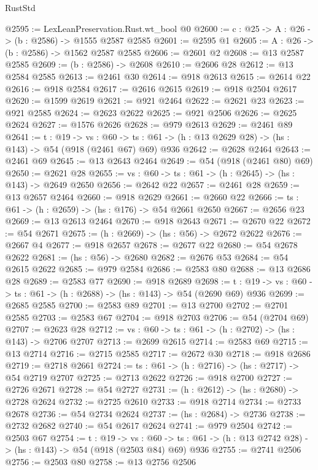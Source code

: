 \begin{lexlean}{RustStd}
\begin{coremodule}
@2595 := LexLeanPreservation.Rust.wt_bool @0
@2600 := {c : @25} -> {A : @26} -> (b : @2586) -> @1555 @2587 @2585
@2601 := @2595 @1
@2605 := {A : @26} -> (b : @2586) -> @1562 @2587 @2585
@2606 := @2601 @2
@2608 := @13 @2587 @2585
@2609 := (b : @2586) -> @2608
@2610 := @2606 @28
@2612 := @13 @2584 @2585
@2613 := @2461 @30
@2614 := @918 @2613
@2615 := @2614 @22
@2616 := @918 @2584
@2617 := @2616 @2615
@2619 := @918 @2504 @2617
@2620 := @1599 @2619
@2621 := @921 @2464
@2622 := @2621 @23
@2623 := @921 @2585
@2624 := @2623 @2622
@2625 := @921 @2506
@2626 := @2625 @2624
@2627 := @1576 @2626
@2628 := @979 @2613
@2629 := @2461 @89
@2641 := {t : @19} ->
  {vs : @60} -> {ts : @61} -> (h : @13 @2629 @28) -> (hs : @143) -> @54 (@918 (@2461 @67) @69) @936
@2642 := @2628 @2464
@2643 := @2461 @69
@2645 := @13 @2643 @2464
@2649 := @54 (@918 (@2461 @80) @69)
@2650 := @2621 @28
@2655 := {vs : @60} -> {ts : @61} -> (h : @2645) -> (hs : @143) -> @2649 @2650
@2656 := @2642 @22
@2657 := @2461 @28
@2659 := @13 @2657 @2464
@2660 := @918 @2629
@2661 := @2660 @22
@2666 := {ts : @61} -> (h : @2659) -> (hs : @176) -> @54 @2661 @2650
@2667 := @2656 @23
@2669 := @13 @2613 @2464
@2670 := @918 @2643
@2671 := @2670 @22
@2672 := @54 @2671
@2675 := (h : @2669) -> (hs : @56) -> @2672 @2622
@2676 := @2667 @4
@2677 := @918 @2657
@2678 := @2677 @22
@2680 := @54 @2678 @2622
@2681 := (hs : @56) -> @2680
@2682 := @2676 @53
@2684 := @54 @2615 @2622
@2685 := @979 @2584
@2686 := @2583 @80
@2688 := @13 @2686 @28
@2689 := @2583 @77
@2690 := @918 @2689
@2698 := {t : @19} -> {vs : @60} -> {ts : @61} -> (h : @2688) -> (hs : @143) -> @54 (@2690 @69) @936
@2699 := @2685 @2585
@2700 := @2583 @89
@2701 := @13 @2700
@2702 := @2701 @2585
@2703 := @2583 @67
@2704 := @918 @2703
@2706 := @54 (@2704 @69)
@2707 := @2623 @28
@2712 := {vs : @60} -> {ts : @61} -> (h : @2702) -> (hs : @143) -> @2706 @2707
@2713 := @2699 @2615
@2714 := @2583 @69
@2715 := @13 @2714
@2716 := @2715 @2585
@2717 := @2672 @30
@2718 := @918 @2686
@2719 := @2718 @2661
@2724 := {ts : @61} -> (h : @2716) -> (hs : @2717) -> @54 @2719 @2707
@2725 := @2713 @2622
@2726 := @918 @2700
@2727 := @2726 @2671
@2728 := @54 @2727
@2731 := (h : @2612) -> (hs : @2680) -> @2728 @2624
@2732 := @2725 @2610
@2733 := @918 @2714
@2734 := @2733 @2678
@2736 := @54 @2734 @2624
@2737 := (hs : @2684) -> @2736
@2738 := @2732 @2682
@2740 := @54 @2617 @2624
@2741 := @979 @2504
@2742 := @2503 @67
@2754 := {t : @19} ->
  {vs : @60} -> {ts : @61} -> (h : @13 @2742 @28) -> (hs : @143) -> @54 (@918 (@2503 @84) @69) @936
@2755 := @2741 @2506
@2756 := @2503 @80
@2758 := @13 @2756 @2506

\end{coremodule}
\end{lexlean}
